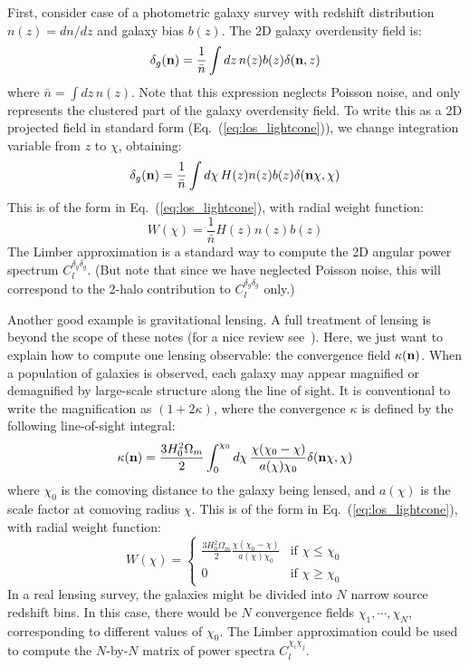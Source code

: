 \documentclass[aps,prd,superscriptaddress,groupedaddress,nofootinbib,nobibnotes]{revtex4}
\newcommand{\be}{\begin{equation}}
\newcommand{\ee}{\end{equation}}
\def\n{{\bf n}}
\begin{document}
First, consider case of a photometric galaxy survey with redshift distribution $n(z) = dn/dz$
and galaxy bias $b(z)$.  The 2D galaxy overdensity field is:
\be
\delta_g(\n) = \frac{1}{\bar n} \int dz \, n(z) b(z) \delta(\n,z)
\ee
where $\bar n = \int dz \, n(z)$.
Note that this expression neglects Poisson noise, and only represents the clustered part of
the galaxy overdensity field.
To write this as a 2D projected field in standard form (Eq.~(\ref{eq:los_lightcone})), we
change integration variable from $z$ to $\chi$, obtaining:
\be
\delta_g(\n) = \frac{1}{\bar n} \int d\chi \, H(z) n(z) b(z) \delta(\n\chi,\chi)
\ee
This is of the form in Eq.~(\ref{eq:los_lightcone}), with radial weight function:
\be
W(\chi) = \frac{1}{\bar n} H(z) n(z) b(z)
\ee
The Limber approximation is a standard way to compute the 2D angular power spectrum $C_l^{\delta_g\delta_g}$.
(But note that since we have neglected Poisson noise, this will correspond to the 2-halo contribution to
$C_l^{\delta_g\delta_g}$ only.)

Another good example is gravitational lensing.
A full treatment of lensing is beyond the scope of these notes (for a nice review see~\cite{Kilbinger:2014cea}).
Here, we just want to explain how to compute one lensing observable: the convergence field $\kappa(\n)$.
When a population of galaxies is observed, each galaxy may appear magnified or demagnified by large-scale structure
along the line of sight.
It is conventional to write the magnification as $(1 + 2\kappa)$, where the convergence $\kappa$ is defined
by the following line-of-sight integral:
\be
\kappa(\n) = \frac{3 H_0^2 \Omega_m}{2}\int_0^{\chi_0} d\chi \, \frac{\chi(\chi_0-\chi)}{a(\chi) \chi_0} \delta(\n\chi,\chi)
\ee
where $\chi_0$ is the comoving distance to the galaxy being lensed, and $a(\chi)$ is the
scale factor at comoving radius $\chi$.
This is of the form in Eq.~(\ref{eq:los_lightcone}), with radial weight function:
\be
W(\chi) = \left\{ \begin{array}{cl}
   \frac{3 H_0^2 \Omega_m}{2} \frac{\chi(\chi_0-\chi)}{a(\chi) \chi_0} & \mbox{if $\chi \le \chi_0$} \\
     0 & \mbox{if $\chi \ge \chi_0$}
 \end{array} \right.
\ee
In a real lensing survey, the galaxies might be divided into $N$ narrow source redshift bins.
In this case, there would be $N$ convergence fields $\chi_1, \cdots, \chi_N$, corresponding to different values of $\chi_0$.
The Limber approximation could be used to compute the $N$-by-$N$ matrix of power spectra $C_l^{\chi_i \chi_j}$.
\end{document}
